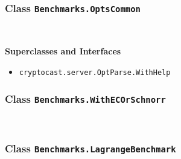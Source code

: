 \subsubsection{Class \lstinline|Benchmarks.OptsCommon|}
 \\
\noindent\begin{minipage}[t]{5cm}
\vspace{0.3em}
\hspace*{2em}
\vspace{0.3em}
\end{minipage}



\textbf{\sffamily Superclasses and Interfaces}
\begin{itemize}
\item \lstinline|cryptocast.server.OptParse.WithHelp|
\end{itemize}



\subsubsection{Class \lstinline|Benchmarks.WithECOrSchnorr|}
 \\
\noindent\begin{minipage}[t]{5cm}
\vspace{0.3em}
\hspace*{2em}
\vspace{0.3em}
\end{minipage}





\subsubsection{Class \lstinline|Benchmarks.LagrangeBenchmark|}
 \\
\noindent\begin{minipage}[t]{5cm}
\vspace{0.3em}
\hspace*{2em}
\vspace{0.3em}
\end{minipage}



